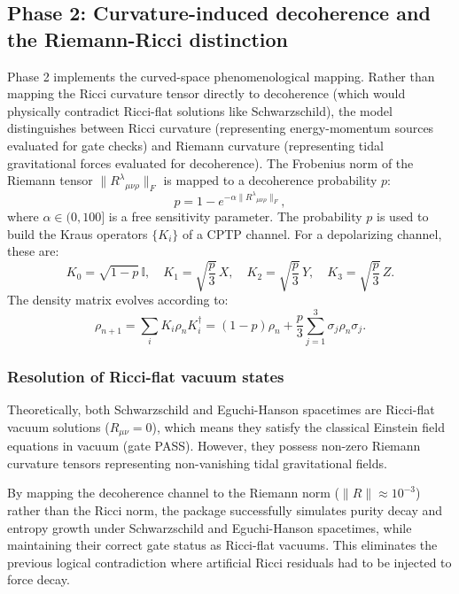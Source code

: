 \subsection{Phase 2: Curvature-induced decoherence and the Riemann-Ricci distinction}
Phase 2 implements the curved-space phenomenological mapping. Rather than mapping the Ricci curvature tensor directly to decoherence (which would physically contradict Ricci-flat solutions like Schwarzschild), the model distinguishes between Ricci curvature (representing energy-momentum sources evaluated for gate checks) and Riemann curvature (representing tidal gravitational forces evaluated for decoherence). The Frobenius norm of the Riemann tensor $\|R^\lambda{}_{\mu\nu\rho}\|_F$ is mapped to a decoherence probability $p$:
\begin{equation}
  p = 1 - e^{-\alpha \|R^\lambda{}_{\mu\nu\rho}\|_F},
  \label{eq:curvature_prob}
\end{equation}
where $\alpha \in (0, 100]$ is a free sensitivity parameter. The probability $p$ is used to build the Kraus operators $\{K_i\}$ of a CPTP channel. For a depolarizing channel, these are:
\begin{equation}
  K_0 = \sqrt{1-p}\,\mathbb{I}, \quad K_1 = \sqrt{\frac{p}{3}}\,X, \quad K_2 = \sqrt{\frac{p}{3}}\,Y, \quad K_3 = \sqrt{\frac{p}{3}}\,Z.
\end{equation}
The density matrix evolves according to:
\begin{equation}
  \rho_{n+1} = \sum_i K_i \rho_n K_i^\dagger = (1-p)\rho_n + \frac{p}{3}\sum_{j=1}^3 \sigma_j \rho_n \sigma_j.
\end{equation}

\subsubsection{Resolution of Ricci-flat vacuum states}
Theoretically, both Schwarzschild and Eguchi-Hanson spacetimes are Ricci-flat vacuum solutions ($R_{\mu\nu} = 0$), which means they satisfy the classical Einstein field equations in vacuum (gate PASS). However, they possess non-zero Riemann curvature tensors representing non-vanishing tidal gravitational fields. 

By mapping the decoherence channel to the Riemann norm ($\|R\| \approx 10^{-3}$) rather than the Ricci norm, the package successfully simulates purity decay and entropy growth under Schwarzschild and Eguchi-Hanson spacetimes, while maintaining their correct gate status as Ricci-flat vacuums. This eliminates the previous logical contradiction where artificial Ricci residuals had to be injected to force decay.

